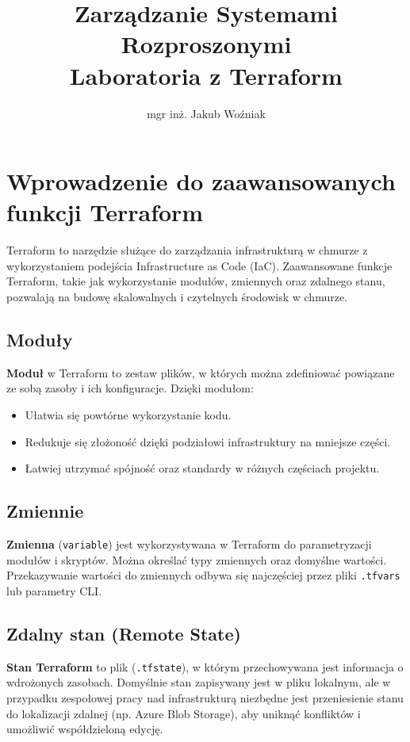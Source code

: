 \documentclass{article}
\title{Zarządzanie Systemami Rozproszonymi\\Laboratoria z Terraform}
\author{mgr inż. Jakub Woźniak}
\begin{document}
\maketitle

\section{Wprowadzenie do zaawansowanych funkcji Terraform}
Terraform to narzędzie służące do zarządzania infrastrukturą w chmurze z wykorzystaniem podejścia Infrastructure as Code (IaC). Zaawansowane funkcje Terraform, takie jak wykorzystanie modułów, zmiennych oraz zdalnego stanu, pozwalają na budowę skalowalnych i czytelnych środowisk w chmurze. 

\subsection{Moduły}
\textbf{Moduł} w Terraform to zestaw plików, w których można zdefiniować powiązane ze sobą zasoby i ich konfiguracje. Dzięki modułom:
\begin{itemize}
    \item Ułatwia się powtórne wykorzystanie kodu.
    \item Redukuje się złożoność dzięki podziałowi infrastruktury na mniejsze części.
    \item Łatwiej utrzymać spójność oraz standardy w różnych częściach projektu.
\end{itemize}

\subsection{Zmiennie}
\textbf{Zmienna} (\texttt{variable}) jest wykorzystywana w Terraform do parametryzacji modułów i skryptów. Można określać typy zmiennych oraz domyślne wartości. Przekazywanie wartości do zmiennych odbywa się najczęściej przez pliki \texttt{.tfvars} lub parametry CLI.

\subsection{Zdalny stan (Remote State)}
\textbf{Stan Terraform} to plik (\texttt{.tfstate}), w którym przechowywana jest informacja o wdrożonych zasobach. Domyślnie stan zapisywany jest w pliku lokalnym, ale w przypadku zespołowej pracy nad infrastrukturą niezbędne jest przeniesienie stanu do lokalizacji zdalnej (np. Azure Blob Storage), aby uniknąć konfliktów i umożliwić współdzieloną edycję.
\end{document}
